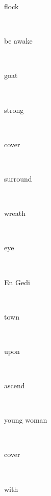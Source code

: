 \documentclass[a4paper]{article}
\begin{document}
\begin{multicols}{4}
\begin{multicols}{4}
\begin{multicols}{5}
{\hebrewfont{}} \begin{english}flock\end{english}\\
{\hebrewfont{}} \begin{english}be awake\end{english}\\
{\hebrewfont{}} \begin{english}goat\end{english}\\
{\hebrewfont{}} \begin{english}strong\end{english}\\
{\hebrewfont{}} \begin{english}cover\end{english}\\
{\hebrewfont{}} \begin{english}surround\end{english}\\
{\hebrewfont{}} \begin{english}wreath\end{english}\\
{\hebrewfont{}} \begin{english}eye\end{english}\\
{\hebrewfont{}} \begin{english}En Gedi\end{english}\\
{\hebrewfont{}} \begin{english}town\end{english}\\
{\hebrewfont{}} \begin{english}upon\end{english}\\
{\hebrewfont{}} \begin{english}ascend\end{english}\\
{\hebrewfont{}} \begin{english}young woman\end{english}\\
{\hebrewfont{}} \begin{english}cover\end{english}\\
{\hebrewfont{}} \begin{english}with\end{english}\\

\end{multicols}
\end{multicols}
\end{multicols}
\end{document}
